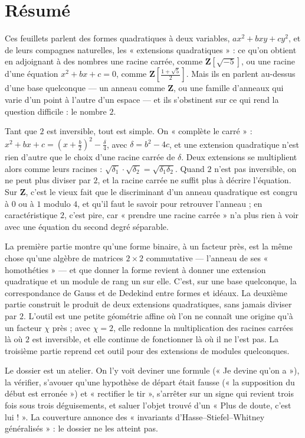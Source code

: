 \documentclass[11pt,a4paper]{article}
\begin{document}
\section*{Résumé}

\begin{resume}
Ces feuillets parlent des formes quadratiques à deux variables,
$ax^{2} + bxy + cy^{2}$, et de leurs compagnes naturelles, les « extensions
quadratiques » : ce qu'on obtient en adjoignant à des nombres une racine
carrée, comme $\mathbf{Z}[\sqrt{-5}]$, ou une racine d'une équation
$x^{2} + bx + c = 0$, comme $\mathbf{Z}[\tfrac{1 + \sqrt{5}}{2}]$. Mais ils en
parlent au-dessus d'une base quelconque --- un anneau comme $\mathbf{Z}$, ou
une famille d'anneaux qui varie d'un point à l'autre d'un espace --- et ils
s'obstinent sur ce qui rend la question difficile : le nombre $2$.

Tant que $2$ est inversible, tout est simple. On « complète le carré » :
$x^{2} + bx + c = (x + \tfrac{b}{2})^{2} - \tfrac{\delta}{4}$, avec
$\delta = b^{2} - 4c$, et une extension quadratique n'est rien d'autre que le
choix d'une racine carrée de $\delta$. Deux extensions se multiplient alors comme
leurs racines : $\sqrt{\delta_1} \cdot \sqrt{\delta_2} = \sqrt{\delta_1\delta_2}$.
Quand $2$ n'est pas inversible, on ne peut plus diviser par $2$, et la racine
carrée ne suffit plus à décrire l'équation. Sur $\mathbf{Z}$, c'est le vieux
fait que le discriminant d'un anneau quadratique est congru à $0$ ou à $1$
modulo $4$, et qu'il faut le savoir pour retrouver l'anneau ; en
caractéristique $2$, c'est pire, car « prendre une racine carrée » n'a plus
rien à voir avec une équation du second degré séparable.

La première partie montre qu'une forme binaire, à un facteur près, est la même
chose qu'une algèbre de matrices $2 \times 2$ commutative --- l'anneau de ses
« homothéties » --- et que donner la forme revient à donner une extension
quadratique et un module de rang un sur elle. C'est, sur une base quelconque,
la correspondance de Gauss et de Dedekind entre formes et idéaux. La deuxième
partie construit le produit de deux extensions quadratiques, sans jamais
diviser par $2$. L'outil est une petite géométrie affine où l'on ne connaît une
origine qu'à un facteur $\chi$ près ; avec $\chi = 2$, elle redonne la
multiplication des racines carrées là où $2$ est inversible, et elle continue de
fonctionner là où il ne l'est pas. La troisième partie reprend cet outil pour
des extensions de modules quelconques.

Le dossier est un atelier. On l'y voit deviner une formule (« Je devine qu'on
a »), la vérifier, s'avouer qu'une hypothèse de départ était fausse (« la
supposition du début est erronée ») et « rectifier le tir », s'arrêter sur un
signe qui revient trois fois sous trois déguisements, et saluer l'objet trouvé
d'un « Plus de doute, c'est lui ! ». La couverture annonce des « invariants
d'Hasse--Stiefel--Whitney généralisés » : le dossier ne les atteint pas.


\end{resume}
\end{document}
